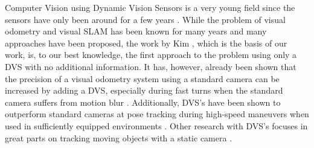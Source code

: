 Computer Vision using Dynamic Vision Sensors is a very young field since
the sensors have only been around for a few years \cite{lpd08dvs, brandli14davis}.
While the problem of visual odometry and visual SLAM has been known for many years
and many approaches have been proposed, the work by Kim \etal \cite{kim2014simultaneous},
which is the basis of our work, is, to our best knowledge, the first approach to the problem
using only a DVS with no additional information.
It has, however, already been shown that the precision of a visual odometry system using
a standard camera can be increased by adding a DVS,
especially during fast turns when the standard camera suffers from motion blur \cite{censi13dvsd_sub}.
Additionally, DVS's have been shown to outperform standard cameras at pose tracking during high-speed maneuvers
when used in sufficiently equipped environments \cite{mueggler2014event}.
Other research with DVS's focuses in great parts on tracking moving objects
with a static camera \cite{vmv.20141280, conradt2009embedded, censi13led}.